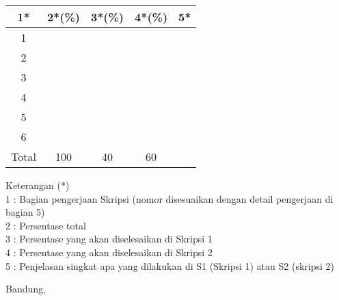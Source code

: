 \documentclass[a4paper,twoside]{article}
\begin{document}
\begin{center}
  \begin{tabular}{ | c | c | c | c | l |}
    \hline
    1*  & 2*(\%) & 3*(\%) & 4*(\%) &5*\\ \hline \hline
    1   &   &   &  &  \\ \hline
    2   &   &   &  &  \\ \hline
    3   &   &   &  & {\footnotesize }  \\ \hline
    4   &   &   &  & {\footnotesize } \\ \hline
    5   &   &   &  & {\footnotesize } \\ \hline
    6   &  &    &  & \\ \hline
    
    Total  & 100  & 40  & 60 &  \\ \hline
                          \end{tabular}
\end{center}

Keterangan (*)\\
1 : Bagian pengerjaan Skripsi (nomor disesuaikan dengan detail pengerjaan di bagian 5)\\
2 : Persentase total \\
3 : Persentase yang akan diselesaikan di Skripsi 1 \\
4 : Persentase yang akan diselesaikan di Skripsi 2 \\
5 : Penjelasan singkat apa yang dilakukan di S1 (Skripsi 1) atau S2 (skripsi 2)

\vspace{1cm}
\centering Bandung, \tanggal\\
\vspace{2cm} \nama \\ 
\vspace{1cm}
\end{document}

